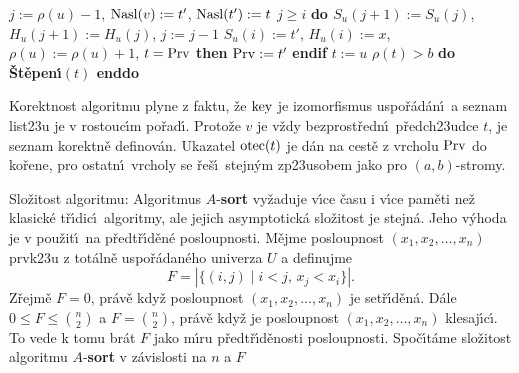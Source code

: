 \phantom{---------}$j:=\rho (u)-1$, $\operatorname{Nasl}(v):=t'$, $\operatorname{Nasl}(t'):=t$\newline 
\phantom{---------}{\bf while} $j\ge i$ {\bf do\newline 
\phantom{------------}$S_u(j+1):=S_u(j)$}, $H_u(j+1):=H_u(j)$, $j:=j-1$\newline 
\phantom{---------}{\bf enddo}\newline 
\phantom{---------}$S_u(i):=t'$, $H_u(i):=x$, $\rho (u):=\rho (u)+1$,\newline 
\phantom{---------}{\bf if} $t=\operatorname{Prv}$ {\bf then} $\operatorname{Prv}:=t'$ {\bf endif}\newline 
\phantom{------}{\bf endif}\newline 
\phantom{------}$t:=u$\newline 
\phantom{------}{\bf while} $\rho (t)>b$ {\bf do \v St\v epen\'\i$(t)$ enddo}\newline 
\phantom{---}{\bf endif\newline 
endif}
\medskip

\flushpar Korektnost algoritmu plyne z faktu, \v ze $\operatorname{key}$ je 
izomorfismus uspo\-\v r\'a\-d\'an\'\i\ a seznam list\accent23u je v 
rostouc\'\i m po\v rad\'\i . Proto\v ze $v$ je v\v zdy bez\-prost\-\v redn\'\i\ 
p\v redch\accent23udce $t$, je seznam korektn\v e definov\'an. 
U\-ka\-zatel $\operatorname{otec}(t)$ je d\'an na cest\v e z vrcholu $\operatorname{Prv}$ do 
ko\v rene, pro ostatn\'\i\ vrcholy se \v re\v s\'\i\ stejn\'ym 
zp\accent23usobem jako pro $(a,b)$-stromy.
\medskip

\flushpar Slo\v zitost algoritmu: Algoritmus $A$-{\bf sort} vy\v zaduje v\'\i ce 
\v casu i v\'\i ce pam\v eti ne\v z klasick\'e t\v r\'\i dic\'\i\ algoritmy, ale jejich 
asymptotick\'a slo\v zitost je stejn\'a. Jeho v\'yhoda je v pou\v zit\'\i\ 
na p\v red\-t\v r\'\i\-d\v en\'e posloupnosti. M\v ejme posloupnost $
(x_1,x_2,\dots,x_n)$ 
prvk\accent23u z to\-t\'aln\v e uspo\v r\'adan\'eho univerza $U$ a definujme 
$$F=|\{(i,j)\mid i<j,\,x_j<x_i\}|.$$
Z\v rejm\v e $F=0$, pr\'av\v e kdy\v z posloupnost 
$(x_1,x_2,\dots,x_n)$ je set\v r\'\i\-d\v en\'a. D\'ale $0\le F\le\binom 
n2$ a $F=\binom n2$, pr\'av\v e 
kdy\v z je posloupnost $(x_1,x_2,\dots,x_n)$ klesaj\'\i c\'\i . To vede k tomu 
br\'at $F$ jako m\'\i ru p\v redt\v r\'\i d\v enosti posloupnosti. Spo\v c\'\i t\'ame 
slo\v zitost algoritmu $A$-{\bf sort} v z\'avislosti na $n$ a $F$
\medskip

